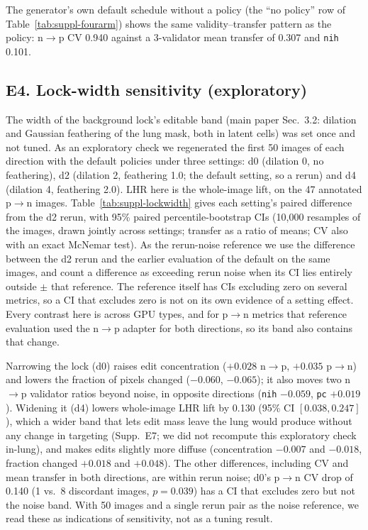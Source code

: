The generator's own default schedule without a policy (the ``no policy'' row of Table~\ref{tab:suppl-fourarm}) shows the same validity--transfer pattern as the policy: n$\to$p CV 0.940 against a 3-validator mean transfer of 0.307 and \texttt{nih} 0.101.

\subsection*{E4. Lock-width sensitivity (exploratory)}
\label{sec:suppl-lockwidth}

The width of the background lock's editable band (main paper Sec.~3.2: dilation and Gaussian feathering of the lung mask, both in latent cells) was set once and not tuned. As an exploratory check we regenerated the first 50 images of each direction with the default policies under three settings: d0 (dilation 0, no feathering), d2 (dilation 2, feathering 1.0; the default setting, so a rerun) and d4 (dilation 4, feathering 2.0). LHR here is the whole-image lift, on the 47 annotated p$\to$n images. Table~\ref{tab:suppl-lockwidth} gives each setting's paired difference from the d2 rerun, with 95\% paired percentile-bootstrap CIs (10{,}000 resamples of the images, drawn jointly across settings; transfer as a ratio of means; CV also with an exact McNemar test). As the rerun-noise reference we use the difference between the d2 rerun and the earlier evaluation of the default on the same images, and count a difference as exceeding rerun noise when its CI lies entirely outside $\pm$ that reference. The reference itself has CIs excluding zero on several metrics, so a CI that excludes zero is not on its own evidence of a setting effect. Every contrast here is across GPU types, and for p$\to$n metrics that reference evaluation used the n$\to$p adapter for both directions, so its band also contains that change.

Narrowing the lock (d0) raises edit concentration ($+0.028$ n$\to$p, $+0.035$ p$\to$n) and lowers the fraction of pixels changed ($-0.060$, $-0.065$); it also moves two n$\to$p validator ratios beyond noise, in opposite directions (\texttt{nih} $-0.059$, \texttt{pc} $+0.019$). Widening it (d4) lowers whole-image LHR lift by 0.130 (95\% CI $[0.038, 0.247]$), which a wider band that lets edit mass leave the lung would produce without any change in targeting (Supp.~E7; we did not recompute this exploratory check in-lung), and makes edits slightly more diffuse (concentration $-0.007$ and $-0.018$, fraction changed $+0.018$ and $+0.048$). The other differences, including CV and mean transfer in both directions, are within rerun noise; d0's p$\to$n CV drop of 0.140 (1 vs.\ 8 discordant images, $p=0.039$) has a CI that excludes zero but not the noise band. With 50 images and a single rerun pair as the noise reference, we read these as indications of sensitivity, not as a tuning result.

